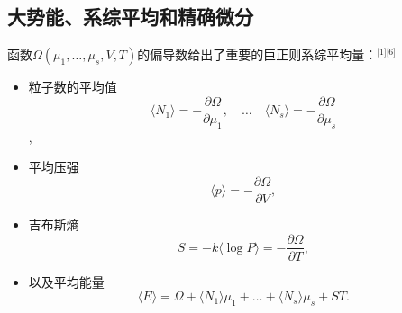 \subsection{大势能、系综平均和精确微分}
函数\(\Omega(\mu_1,\dots,\mu_s,V,T)\)的偏导数给出了重要的巨正则系综平均量：\(^\text{[1][6]}\)
\begin{itemize}
\item 粒子数的平均值  
\[\langle N_1 \rangle = -\frac{\partial \Omega}{\partial \mu_1}, \quad \dots \quad \langle N_s \rangle = -\frac{\partial \Omega}{\partial \mu_s}~\],  
\item 平均压强  
\[\langle p \rangle = -\frac{\partial \Omega}{\partial V},~\]
\item 吉布斯熵  
\[S = -k \langle \log P \rangle = -\frac{\partial \Omega}{\partial T},~\]
\item 以及平均能量  
\[\langle E \rangle = \Omega + \langle N_1 \rangle \mu_1 + \dots + \langle N_s \rangle \mu_s + S T.~\]
\end{itemize}